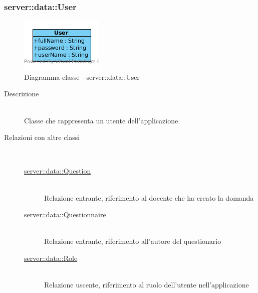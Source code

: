 \vspace{0.5cm}
\hypertarget{server::data::User}{}
\subsubsection[User]{server::data::User}
\begin{center}
			\begin{figure}[H]
				\centering \includegraphics[scale=4, max width=\textwidth, max height=\myheight]{../img/diagrammiClassi/server/data/User.png}
				\caption{Diagramma classe - server::data::User}
			\end{figure}
		\end{center}\begin{description}
\item[Descrizione] \hfill \\
 Classe che rappresenta un utente dell'applicazione
\item[Relazioni con altre classi] \hfill \\
 \vspace{-7mm}
\begin{description}
\item[\hyperlink{server::data::Question}{server::data::Question}] \hfill \\
 Relazione entrante, riferimento al docente che ha creato la domanda
\item[\hyperlink{server::data::Questionnaire}{server::data::Questionnaire}] \hfill \\
 Relazione entrante, riferimento all'autore del questionario
\item[\hyperlink{server::data::Role}{server::data::Role}] \hfill \\
 Relazione uscente, riferimento al ruolo dell'utente nell'applicazione
\end{description}


\end{description}
